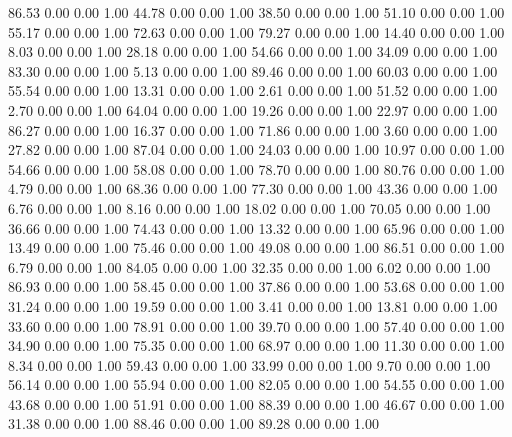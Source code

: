    86.53   0.00   0.00   1.00
   44.78   0.00   0.00   1.00
   38.50   0.00   0.00   1.00
   51.10   0.00   0.00   1.00
   55.17   0.00   0.00   1.00
   72.63   0.00   0.00   1.00
   79.27   0.00   0.00   1.00
   14.40   0.00   0.00   1.00
    8.03   0.00   0.00   1.00
   28.18   0.00   0.00   1.00
   54.66   0.00   0.00   1.00
   34.09   0.00   0.00   1.00
   83.30   0.00   0.00   1.00
    5.13   0.00   0.00   1.00
   89.46   0.00   0.00   1.00
   60.03   0.00   0.00   1.00
   55.54   0.00   0.00   1.00
   13.31   0.00   0.00   1.00
    2.61   0.00   0.00   1.00
   51.52   0.00   0.00   1.00
    2.70   0.00   0.00   1.00
   64.04   0.00   0.00   1.00
   19.26   0.00   0.00   1.00
   22.97   0.00   0.00   1.00
   86.27   0.00   0.00   1.00
   16.37   0.00   0.00   1.00
   71.86   0.00   0.00   1.00
    3.60   0.00   0.00   1.00
   27.82   0.00   0.00   1.00
   87.04   0.00   0.00   1.00
   24.03   0.00   0.00   1.00
   10.97   0.00   0.00   1.00
   54.66   0.00   0.00   1.00
   58.08   0.00   0.00   1.00
   78.70   0.00   0.00   1.00
   80.76   0.00   0.00   1.00
    4.79   0.00   0.00   1.00
   68.36   0.00   0.00   1.00
   77.30   0.00   0.00   1.00
   43.36   0.00   0.00   1.00
    6.76   0.00   0.00   1.00
    8.16   0.00   0.00   1.00
   18.02   0.00   0.00   1.00
   70.05   0.00   0.00   1.00
   36.66   0.00   0.00   1.00
   74.43   0.00   0.00   1.00
   13.32   0.00   0.00   1.00
   65.96   0.00   0.00   1.00
   13.49   0.00   0.00   1.00
   75.46   0.00   0.00   1.00
   49.08   0.00   0.00   1.00
   86.51   0.00   0.00   1.00
    6.79   0.00   0.00   1.00
   84.05   0.00   0.00   1.00
   32.35   0.00   0.00   1.00
    6.02   0.00   0.00   1.00
   86.93   0.00   0.00   1.00
   58.45   0.00   0.00   1.00
   37.86   0.00   0.00   1.00
   53.68   0.00   0.00   1.00
   31.24   0.00   0.00   1.00
   19.59   0.00   0.00   1.00
    3.41   0.00   0.00   1.00
   13.81   0.00   0.00   1.00
   33.60   0.00   0.00   1.00
   78.91   0.00   0.00   1.00
   39.70   0.00   0.00   1.00
   57.40   0.00   0.00   1.00
   34.90   0.00   0.00   1.00
   75.35   0.00   0.00   1.00
   68.97   0.00   0.00   1.00
   11.30   0.00   0.00   1.00
    8.34   0.00   0.00   1.00
   59.43   0.00   0.00   1.00
   33.99   0.00   0.00   1.00
    9.70   0.00   0.00   1.00
   56.14   0.00   0.00   1.00
   55.94   0.00   0.00   1.00
   82.05   0.00   0.00   1.00
   54.55   0.00   0.00   1.00
   43.68   0.00   0.00   1.00
   51.91   0.00   0.00   1.00
   88.39   0.00   0.00   1.00
   46.67   0.00   0.00   1.00
   31.38   0.00   0.00   1.00
   88.46   0.00   0.00   1.00
   89.28   0.00   0.00   1.00
